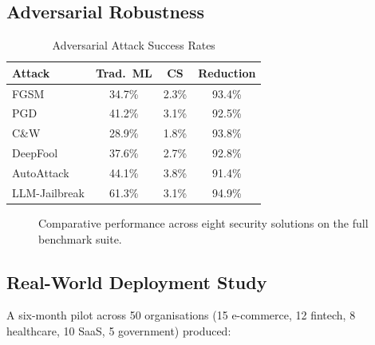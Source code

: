 \documentclass[10pt,twocolumn]{article}
\begin{document}
\subsection{Adversarial Robustness}

\begin{table}[H]
\centering
\caption{Adversarial Attack Success Rates}
\label{tab:adv}
\small
\setlength{\tabcolsep}{4pt}
\begin{tabular}{@{}lccc@{}}
\toprule
\textbf{Attack} & \textbf{Trad.\ ML} & \textbf{CS} & \textbf{Reduction} \\
\midrule
FGSM          & 34.7\% & 2.3\% & 93.4\% \\
PGD           & 41.2\% & 3.1\% & 92.5\% \\
C\&W          & 28.9\% & 1.8\% & 93.8\% \\
DeepFool      & 37.6\% & 2.7\% & 92.8\% \\
AutoAttack    & 44.1\% & 3.8\% & 91.4\% \\
LLM-Jailbreak & 61.3\% & 3.1\% & 94.9\% \\
\bottomrule
\end{tabular}
\end{table}

\begin{figure}[H]
  \centering
  \caption{Comparative performance across eight security solutions
           on the full benchmark suite.}
  \label{fig:benchmark}
\end{figure}

\subsection{Real-World Deployment Study}

A six-month pilot across 50 organisations (15 e-commerce, 12 fintech,
8 healthcare, 10 SaaS, 5 government) produced:
\end{document}

